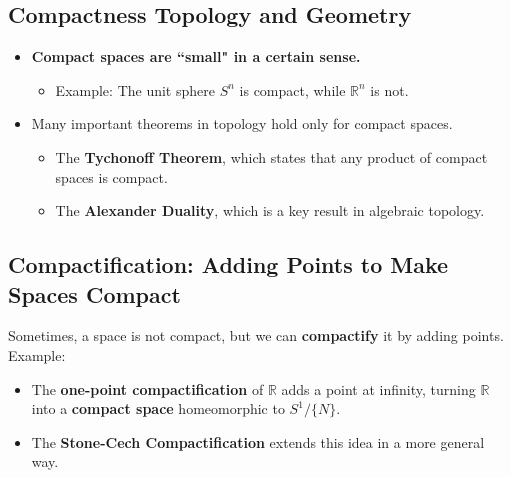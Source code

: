 \documentclass{article}
\begin{document}
\subsection{Compactness Topology and Geometry}
\begin{itemize}
    \item \textbf{Compact spaces are ``small" in a certain sense.}
    \begin{itemize}
        \item Example: The unit sphere $S^n$ is compact, while $\mathbb{R}^n$ is not.
    \end{itemize}
    \item Many important theorems in topology hold only for compact spaces.
    \begin{itemize}
        \item The \textbf{Tychonoff Theorem}, which states that any product of compact spaces is compact.
        \item The \textbf{Alexander Duality}, which is a key result in algebraic topology.
    \end{itemize}
\end{itemize}


\subsection{Compactification: Adding Points to Make Spaces Compact}
Sometimes, a space is not compact, but we can \textbf{compactify} it by adding points.
Example:
\begin{itemize}
    \item The \textbf{one-point compactification} of $\mathbb{R}$ adds a point at infinity,
        turning $\mathbb{R}$ into a \textbf{compact space} homeomorphic to $S^1/ \{N\}$.
    \item The \textbf{Stone-Cech Compactification} extends this idea in a more general way.
\end{itemize}
\end{document}
